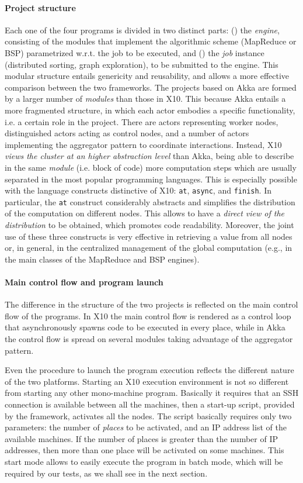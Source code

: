 \documentclass[a4paper]{article}
\numberwithin{equation}{section}
\begin{document}
\paragraph{Project structure}
Each one of the four programs is divided in two distinct parts:
() the \emph{engine}, consisting of the modules that implement the
algorithmic scheme (MapReduce or BSP) parametrized
w.r.t. the job to be executed, 
and () the \emph{job} instance (distributed sorting, graph
exploration), to be submitted to the engine.
This modular structure entails genericity and reusability, and allows
a more effective comparison between the two frameworks.
The projects based on Akka are formed by a larger
  number of \emph{modules} than those in X10. 
This because Akka entails a more fragmented 
structure, in which each actor embodies a specific functionality,
i.e. a certain role in the project. There are actors
representing worker nodes, distinguished actors acting as control
nodes, 
and a number of actors implementing the aggregator pattern to
coordinate interactions.
Instead, 
X10 \emph{views the cluster at an higher abstraction level} than
Akka, being able to describe in the same \emph{module} (i.e. block of
code) more computation steps which are usually separated in the most
popular programming languages. This is especially possible with
the language constructs distinctive of X10: \verb+at+,
\verb+async+, and \verb+finish+. 
In particular, the \verb+at+ construct considerably abstracts and simplifies the distribution of the computation on different nodes.
This allows to have a \textit{direct view of the distribution} 
to be obtained, which promotes code readability. 
Moreover, the joint use of these three constructs is very effective in
retrieving a value from all nodes or, in general, in the centralized
management of the global computation
(e.g., in the main classes of the MapReduce and BSP engines).

\paragraph{Main control flow and program launch}
The difference in the structure of the two projects is reflected on
the main control flow of the programs. In X10 the main control flow is
rendered as a control loop that asynchronously spawns code to be
executed in every place, while in Akka the control flow is spread on
several modules taking advantage of the aggregator pattern.

Even the procedure to launch the program execution reflects the
different nature of the two platforms. Starting an X10 execution
environment is not so different from starting any other mono-machine
program. Basically it requires that an SSH connection is available
between all the machines, then a start-up script, provided by the
framework, activates all the nodes. The script basically requires only
two parameters: the number of \emph{places} to be activated, and an
IP address list of the available machines. 
If the number of places is greater than the number of IP addresses,
then more than one place will be activated on some machines. 
This start mode allows to easily execute the program in batch mode,
which will be required by our tests, as we shall see in the next
section.
\end{document}
